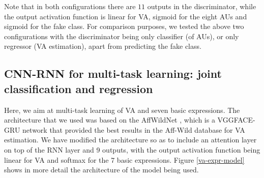 \documentclass[a4paper, 10pt, conference]{ieeeconf}      %
\begin{document}
\begin{table}[h]
\centering
\caption{Configuration 2: Discriminator network of our semi-supervised GAN; input is a $96 \times 96 \times 3$ image}
\label{discr_dcgan}
\end{table}


Note that in both configurations there are $11$ outputs in the discriminator, while the output activation function is linear for VA, sigmoid for the eight AUs and sigmoid for the fake class. 
For comparison purposes, we tested the above two configurations with the discriminator being only classifier (of AUs), or only regressor (VA estimation), apart from predicting the fake class.


\subsection{CNN-RNN for multi-task learning: joint  classification and regression}\label{cnn-rnn_va_expr}

Here, we aim at multi-task learning of VA and seven basic expressions. The architecture that we used was based on the AffWildNet \cite{kollias2017recognition}, which is a VGGFACE-GRU \cite{parkhi2015deep}\cite{chung2014empirical} network that provided the best results in the Aff-Wild database for VA estimation. We have modified the architecture so as to include an attention layer on top of the RNN layer and 9 outputs, with the output activation function being linear for VA and softmax for the 7 basic expressions. Figure \ref{va-expr-model} shows in more detail the architecture of the model being used.
\end{document}
